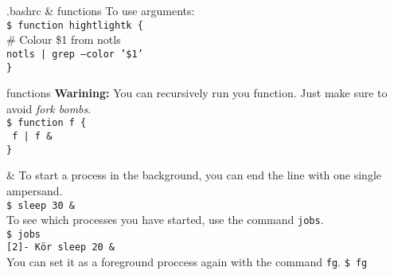 \documentclass{beamer}
\let\tt\texttt
\let\bf\textbf
\let\it\itshape
\begin{document}
\begin{frame}{.bashrc \& functions}
        To use arguments:                       \\
        \tt{\$ function hightlightk \{ }        \\
        \quad \# Colour \$1 from notls          \\
        \quad \tt{notls | grep --color '\$1' }  \\
        \tt{\} }                                \\
\end{frame}

\begin{frame}{functions}
        \bf{Warining:} You can recursively run you function. Just make sure to avoid {\it fork bombs}.  \\
        \tt{\$ function f \{ }        \\
        \quad \tt{ f | f {\&}}  \\
        \tt{\} }                                \\
\end{frame}

\begin{frame}{\&}
        To start a process in the background, you can end the line with one single ampersand.   \\
        \tt{\$ sleep 30 {\&} }    \\
        To see which processes you have started, use the command \tt{jobs}. \\
        \tt{\$ jobs }  \\
        \tt{[2]- Kör sleep 20 {\&}}  \\
        You can set it as a foreground proccess again with the command \tt{fg}.
        \tt{\$ fg}  \\
        \tt{} \\
\end{frame}
\end{document}
